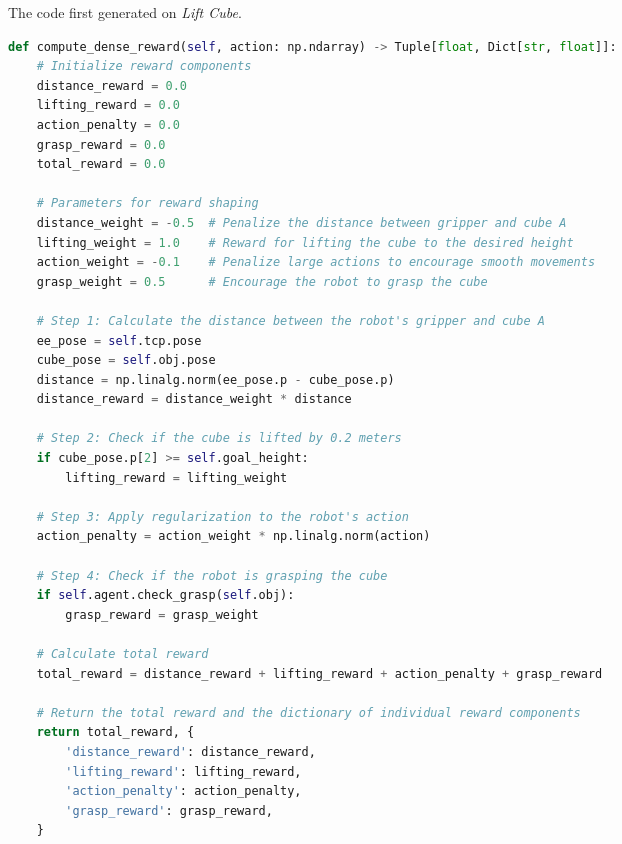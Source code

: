 \documentclass{article}
\theoremstyle{plain}
\theoremstyle{definition}
\theoremstyle{remark}
\begin{document}
\begin{table}[!ht]
\centering
\caption{The code first generated on \textit{Lift Cube}.}
\begin{tcolorbox}
\begin{lstlisting}[language=Python,breaklines]
def compute_dense_reward(self, action: np.ndarray) -> Tuple[float, Dict[str, float]]:
    # Initialize reward components
    distance_reward = 0.0
    lifting_reward = 0.0
    action_penalty = 0.0
    grasp_reward = 0.0
    total_reward = 0.0

    # Parameters for reward shaping
    distance_weight = -0.5  # Penalize the distance between gripper and cube A
    lifting_weight = 1.0    # Reward for lifting the cube to the desired height
    action_weight = -0.1    # Penalize large actions to encourage smooth movements
    grasp_weight = 0.5      # Encourage the robot to grasp the cube

    # Step 1: Calculate the distance between the robot's gripper and cube A
    ee_pose = self.tcp.pose
    cube_pose = self.obj.pose
    distance = np.linalg.norm(ee_pose.p - cube_pose.p)
    distance_reward = distance_weight * distance

    # Step 2: Check if the cube is lifted by 0.2 meters
    if cube_pose.p[2] >= self.goal_height:
        lifting_reward = lifting_weight

    # Step 3: Apply regularization to the robot's action
    action_penalty = action_weight * np.linalg.norm(action)

    # Step 4: Check if the robot is grasping the cube
    if self.agent.check_grasp(self.obj):
        grasp_reward = grasp_weight

    # Calculate total reward
    total_reward = distance_reward + lifting_reward + action_penalty + grasp_reward

    # Return the total reward and the dictionary of individual reward components
    return total_reward, {
        'distance_reward': distance_reward,
        'lifting_reward': lifting_reward,
        'action_penalty': action_penalty,
        'grasp_reward': grasp_reward,
    }
\end{lstlisting}
\end{tcolorbox}
\label{tab:iterative_process_on_liftcube_0}
\end{table}
\end{document}
